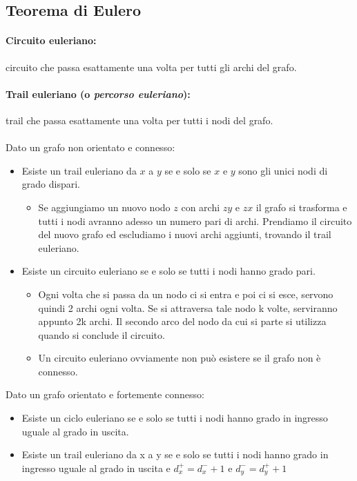\documentclass[a4paper,12pt]{article}
\begin{document}
\subsection{Teorema di Eulero}
\paragraph{Circuito euleriano: } circuito che passa esattamente una volta per tutti gli archi del grafo.
\paragraph{Trail euleriano (o \emph{percorso euleriano}): } trail che passa esattamente una volta per tutti i nodi del grafo.\\\\
Dato un grafo non orientato e connesso:
\begin{itemize}
    \item Esiste un trail euleriano da $x$ a $y$ se e solo se $x$ e $y$ sono gli unici nodi di grado dispari.
    \begin{itemize}
        \item Se aggiungiamo un nuovo nodo $z$ con archi $zy$ e $zx$ il grafo si trasforma e tutti i nodi avranno adesso un numero pari di archi. Prendiamo il circuito del nuovo grafo ed escludiamo i nuovi archi aggiunti, trovando il trail euleriano.
    \end{itemize}
    \item Esiste un circuito euleriano se e solo se tutti i nodi hanno grado pari.
    \begin{itemize}
        \item Ogni volta che si passa da un nodo ci si entra e poi ci si esce, servono quindi 2 archi ogni volta. Se
        si attraversa tale nodo k volte, serviranno appunto 2k archi. Il secondo arco del nodo da cui si parte si utilizza quando si conclude il circuito.
        \item Un circuito euleriano ovviamente non può esistere se il grafo non è connesso.
    \end{itemize}
\end{itemize}
Dato un grafo orientato e fortemente connesso:
\begin{itemize}
    \item Esiste un ciclo euleriano se e solo se tutti i nodi hanno grado in ingresso uguale al grado in uscita.
    \item Esiste un trail euleriano da x a y se e solo se tutti i nodi hanno grado in ingresso uguale al grado in uscita e $d^+_x = d^-_x + 1$ e $d^-_y = d^+_y + 1$
\end{itemize}
\end{document}
